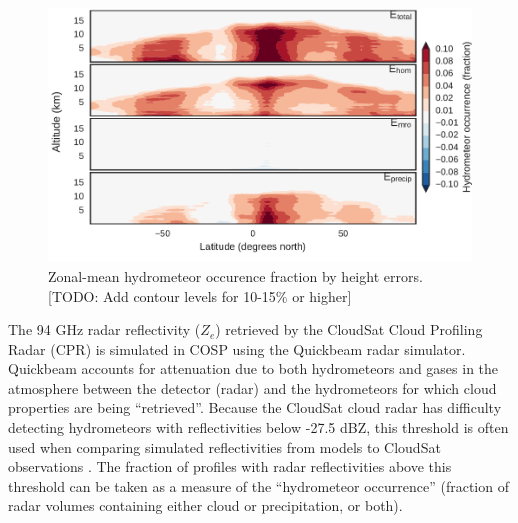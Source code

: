 \begin{figure}[htbp]
\centering
\includegraphics{graphics/subgrid1_hfba_zonal_diff.pdf}
\caption{\label{fig:hfbaZonalMroDiff}Zonal-mean hydrometeor occurence
fraction by height errors. {[}TODO: Add contour levels for 10-15\% or
higher{]}}\label{fig:hfbaZonalMroDiff}
\end{figure}

The 94 GHz radar reflectivity (\(Z_e\)) retrieved by the CloudSat Cloud
Profiling Radar (CPR) is simulated in COSP using the Quickbeam
\citep{haynes_et_al_2007} radar simulator. Quickbeam accounts for
attenuation due to both hydrometeors and gases in the atmosphere between
the detector (radar) and the hydrometeors for which cloud properties are
being ``retrieved''. Because the CloudSat cloud radar has difficulty
detecting hydrometeors with reflectivities below -27.5 dBZ, this
threshold is often used when comparing simulated reflectivities from
models to CloudSat observations \citep{marchand_et_al_2009}. The
fraction of profiles with radar reflectivities above this threshold can
be taken as a measure of the ``hydrometeor occurrence'' (fraction of
radar volumes containing either cloud or precipitation, or both).

